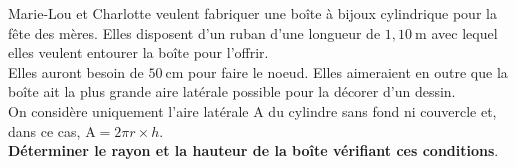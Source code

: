 \documentclass[12pt,a4paper]{article}  %
\begin{document}

Marie-Lou et Charlotte veulent fabriquer une boîte à bijoux cylindrique pour la fête des mères. Elles disposent d'un ruban d'une longueur de $1,10 \mathrm{~m}$ avec lequel elles veulent entourer la boîte pour l'offrir.\\

Elles auront besoin de $50 \mathrm{~cm}$ pour faire le noeud. Elles aimeraient en outre que la boîte ait la plus grande aire latérale possible pour la décorer d'un dessin.\\
On considère uniquement l'aire latérale A du cylindre sans fond ni couvercle et, dans ce cas, $\mathrm{A}=2 \pi r \times h$.\\

\textbf{Déterminer le rayon et la hauteur de la boîte vérifiant ces conditions}.
\end{document}
